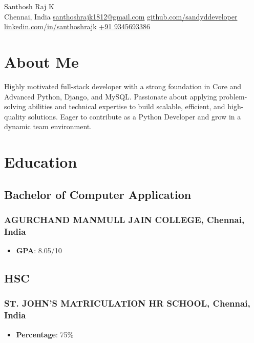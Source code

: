 \documentclass[11pt]{article}
\begin{document}
\begin{center}      
    {\fontsize{24}{24}\selectfont Santhosh Raj K} \\[10pt] %

    {\color{icnclr}\faMapMarker} Chennai, India \quad 
    {\color{icnclr}\faEnvelope[regular]} \href{mailto:santhoshrajk1812@gmail.com}{santhoshrajk1812@gmail.com} \quad
    {\color{icnclr}\faGithub[regular]} \href{https://github.com/sandyddeveloper}{github.com/sandyddeveloper} \quad \\[10pt]
    {\color{icnclr}\faLinkedin[regular]} \href{https://linkedin.com/in/santhoshrajk}{linkedin.com/in/santhoshrajk} \quad
    {\color{icnclr}\Mobilefone} \href{tel:+91 9345693386}{+91 9345693386}
\end{center}

\section{About Me}
Highly motivated full-stack developer with a strong foundation in Core and Advanced Python, Django, and MySQL.
Passionate about applying problem-solving abilities and technical expertise to build scalable, efficient, and high-quality solutions.
Eager to contribute as a Python Developer and grow in a dynamic team environment.
\section{Education}
\subsection{Bachelor of Computer Application \hfill {}}  
\subsubsection{AGURCHAND MANMULL JAIN COLLEGE, Chennai, India}
\begin{itemize}
    \item \textbf{GPA}: 8.05/10
\end{itemize}

\subsection{HSC \hfill {}}  
\subsubsection{ST. JOHN'S MATRICULATION HR SCHOOL, Chennai, India}
\begin{itemize}
    \item \textbf{Percentage}: 75\%
\end{itemize}
\end{document}
